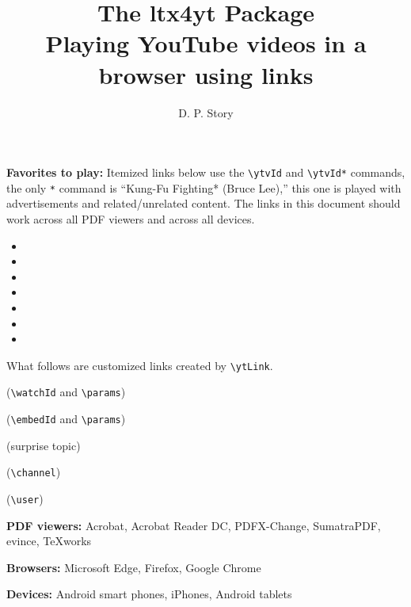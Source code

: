 \documentclass{article}
\title{The \texorpdfstring{\textsf{ltx4yt} Package\\[3pt]}{ltx4yt Package: }Playing YouTube videos in a browser using links}
\author{D. P. Story}
\begin{document}
\maketitle

\textbf{Favorites to play:} Itemized links below use the \verb~\ytvId~ and \verb~\ytvId*~ commands,
the only \texttt{*} command is ``Kung-Fu Fighting* (Bruce Lee),'' this one is played with advertisements
and related/unrelated content. The links in this document should work across all PDF viewers and across all devices.
\begin{flushleft}\raggedcolumns
\begin{multicols}{2}\bfseries
\begin{itemize}

\item {}

\item {}

\item {}

\item {}

\item {}

\item {}

\item {}

\end{itemize}
\end{multicols}
\end{flushleft}
What follows are customized links created by \verb~\ytLink~.

 (\verb~\watchId~ and \verb~\params~)

 (\verb~\embedId~ and \verb~\params~)


 (surprise topic)

 (\verb~\channel~)

 (\verb~\user~)

\textbf{PDF viewers:} \textsf{Acrobat}, \textsf{Acrobat Reader DC}, \textsf{PDFX-Change}, \textsf{SumatraPDF}, \textsf{evince}, \textsf{TeXworks}

\textbf{Browsers:} \textsf{Microsoft Edge}, \textsf{Firefox}, \textsf{Google Chrome}

\textbf{Devices:} \textsf{Android} smart phones, \textsf{iPhones}, \textsf{Android} tablets
\end{document}

